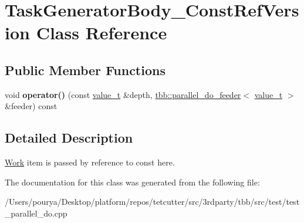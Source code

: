 \hypertarget{classTaskGeneratorBody__ConstRefVersion}{}\section{Task\+Generator\+Body\+\_\+\+Const\+Ref\+Version Class Reference}
\label{classTaskGeneratorBody__ConstRefVersion}
\subsection*{Public Member Functions}
\begin{DoxyCompactItemize}
\item 
\hypertarget{classTaskGeneratorBody__ConstRefVersion_a7bd6de0f789186bb8a551178af39b847}{}void {\bfseries operator()} (const \hyperlink{classvalue__t}{value\+\_\+t} \&depth, \hyperlink{classtbb_1_1parallel__do__feeder}{tbb\+::parallel\+\_\+do\+\_\+feeder}$<$ \hyperlink{classvalue__t}{value\+\_\+t} $>$ \&feeder) const \label{classTaskGeneratorBody__ConstRefVersion_a7bd6de0f789186bb8a551178af39b847}

\end{DoxyCompactItemize}


\subsection{Detailed Description}
\hyperlink{structWork}{Work} item is passed by reference to const here. 

The documentation for this class was generated from the following file\+:\begin{DoxyCompactItemize}
\item 
/\+Users/pourya/\+Desktop/platform/repos/tetcutter/src/3rdparty/tbb/src/test/test\+\_\+parallel\+\_\+do.\+cpp\end{DoxyCompactItemize}
